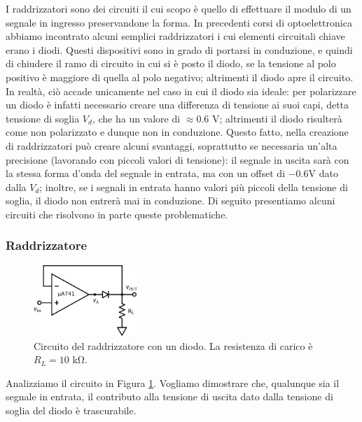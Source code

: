 I raddrizzatori sono dei circuiti il cui scopo è quello di effettuare il modulo di un segnale in ingresso preservandone la forma. In precedenti corsi di optoelettronica abbiamo incontrato alcuni semplici raddrizzatori i cui elementi circuitali chiave erano i diodi. Questi dispositivi sono in grado di portarsi in conduzione, e quindi di chiudere il ramo di circuito in cui si è posto il diodo, se la tensione al polo positivo è maggiore di quella al polo negativo; altrimenti il diodo apre il circuito. In realtà, ciò accade unicamente nel caso in cui il diodo sia ideale: per polarizzare un diodo è infatti necessario creare una differenza di tensione ai suoi capi, detta tensione di soglia $V_d$, che ha un valore di $\approx 0.6$ \si{\volt}; altrimenti il diodo risulterà come non polarizzato e dunque non in conduzione. Questo fatto, nella creazione di raddrizzatori può creare alcuni svantaggi, soprattutto se necessaria un'alta precisione (lavorando con piccoli valori di tensione): il segnale in uscita sarà con la stessa forma d'onda del segnale in entrata, ma con un offset di $-0.6$\si{\volt} dato dalla $V_d$; inoltre, se i segnali in entrata hanno valori più piccoli della tensione di soglia, il diodo non entrerà mai in conduzione. Di seguito presentiamo alcuni circuiti che risolvono in parte queste problematiche.

\subsubsection{Raddrizzatore}

\begin{figure}
  \begin{center}
    \includegraphics[width=0.350\textwidth]{../E05/latex/c_rectifier_A.pdf}
  \end{center}
  \caption{Circuito del raddrizzatore con un diodo. La resistenza di carico è $R_L=10$ \si{\kilo\ohm}.}
  \label{cir5:raddrizz_1}
\end{figure}

Analizziamo il circuito in Figura \ref{cir5:raddrizz_1}. Vogliamo dimostrare che, qualunque sia il segnale in entrata, il contributo alla tensione di uscita dato dalla tensione di soglia del diodo è trascurabile.

